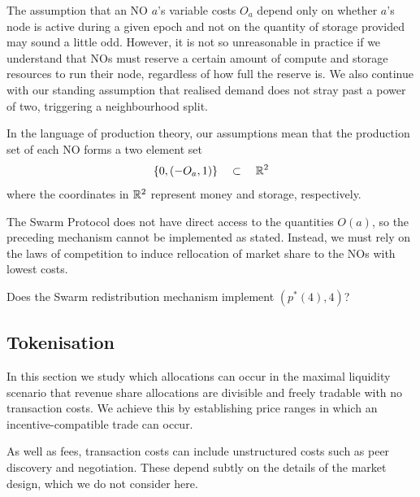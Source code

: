 \begin{remark}

  The assumption that an NO $a$'s variable costs $O_a$ depend only on whether $a$'s node is active during a given epoch and not on the quantity of storage provided may sound a little odd.
  However, it is not so unreasonable in practice if we understand that NOs must reserve a certain amount of compute and storage resources to run their node, regardless of how full the reserve is.
  We also continue with our standing assumption that realised demand does not stray past a power of two, triggering a neighbourhood split.

  In the language of production theory, our assumptions mean that the production set of each NO forms a two element set
  \[
    \{0, (-O_a,1) \} \quad \subset \quad \mathbb{R}^2
  \]
  where the coordinates in $\mathbb{R}^2$ represent money and storage, respectively.

\end{remark}

The Swarm Protocol does not have direct access to the quantities $O(a)$, so the preceding mechanism cannot be implemented as stated.
%
Instead, we must rely on the laws of competition to induce rellocation of market share to the NOs with lowest costs.

\begin{question} Does the Swarm redistribution mechanism implement $(p^*(4),4)$? \end{question}










\subsection{Tokenisation}
\label{section:tokenisation}

In this section we study which allocations can occur in the maximal liquidity scenario that revenue share allocations are divisible and freely tradable with no transaction costs.
%
We achieve this by establishing price ranges in which an incentive-compatible trade can occur.

\begin{remark}

  As well as fees, transaction costs can include unstructured costs such as peer discovery and negotiation.
  These depend subtly on the details of the market design, which we do not consider here.

\end{remark}

